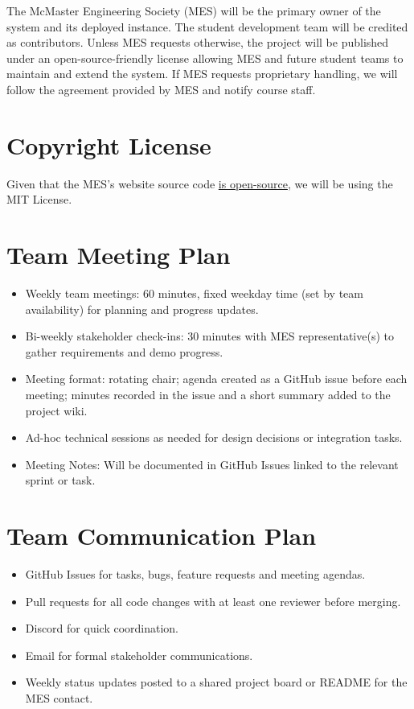 \documentclass{article}
\begin{document}
The McMaster Engineering Society (MES) will be the primary owner of the system and its deployed instance. The student development team will be credited as contributors. Unless MES requests otherwise, the project will be published under an open-source-friendly license allowing MES and future student teams to maintain and extend the system. If MES requests proprietary handling, we will follow the agreement provided by MES and notify course staff.

\section{Copyright License}

Given that the MES's website source code \href{https://github.com/McMaster-Engineering-Society/MES-Website-App-Router}{is open-source}, we will be using the MIT License.

\section{Team Meeting Plan}

\begin{itemize}
  \item Weekly team meetings: 60 minutes, fixed weekday time (set by team availability) for planning and progress updates.
  \item Bi-weekly stakeholder check-ins: 30 minutes with MES representative(s) to gather requirements and demo progress.
  \item Meeting format: rotating chair; agenda created as a GitHub issue before each meeting; minutes recorded in the issue and a short summary added to the project wiki.
  \item Ad-hoc technical sessions as needed for design decisions or integration tasks.
  \item Meeting Notes: Will be documented in GitHub Issues linked to the relevant sprint or task.
\end{itemize}

\section{Team Communication Plan}

\begin{itemize}
  \item GitHub Issues for tasks, bugs, feature requests and meeting agendas.
  \item Pull requests for all code changes with at least one reviewer before merging.
  \item Discord for quick coordination.
  \item Email for formal stakeholder communications.
  \item Weekly status updates posted to a shared project board or README for the MES contact.
\end{itemize}
\end{document}
